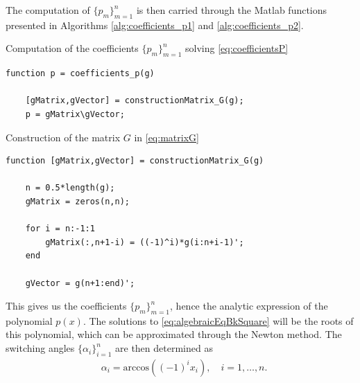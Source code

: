 \documentclass[a4paper]{article}
\numberwithin{equation}{section}
\begin{document}
{The computation of $\{p_m\}_{m=1}^n$ is then carried through the Matlab functions presented in Algorithms \ref{alg:coefficients_p1} and \ref{alg:coefficients_p2}.

\begin{algorithm}
	\caption{Computation of the coefficients $\{p_m\}_{m=1}^n$ solving \eqref{eq:coefficientsP}} \label{alg:coefficients_p1}
	\begin{lstlisting}[style=Matlab-editor, basicstyle=\mlttfamily\footnotesize]
	function p = coefficients_p(g)
	
	[gMatrix,gVector] = constructionMatrix_G(g);          
	p = gMatrix\gVector;
\end{lstlisting}
\end{algorithm}

\begin{algorithm}
	\caption{Construction of the matrix $G$ in \eqref{eq:matrixG}} \label{alg:coefficients_p2}
	\begin{lstlisting}[style=Matlab-editor, basicstyle=\mlttfamily\footnotesize]
	function [gMatrix,gVector] = constructionMatrix_G(g)
	
	n = 0.5*length(g);
	gMatrix = zeros(n,n);
	
	for i = n:-1:1
		gMatrix(:,n+1-i) = ((-1)^i)*g(i:n+i-1)';
	end
	
	gVector = g(n+1:end)';
	\end{lstlisting}
\end{algorithm} 

This gives us the coefficients $\{p_m\}_{m=1}^n$, hence the analytic expression of the polynomial $p(x)$. The solutions to \eqref{eq:algebraicEqBkSquare} will be the roots of this polynomial, which can be approximated through the Newton method. The switching angles $\{\alpha_i\}_{i=1}^n$ are then determined as
\begin{align*}
	&\alpha_i = \mbox{arccos}\left((-1)^ix_i\right), \quad i=1,\ldots,n.
\end{align*}

}
\end{document}
